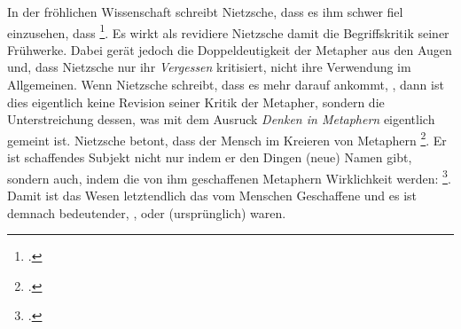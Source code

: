 \documentclass[12pt, a4paper, openany]{report}
\begin{document}
In der fröhlichen Wissenschaft schreibt Nietzsche, dass es ihm schwer fiel einzusehen, dass \footcite[][§ 58. S. 422.]{nietzsche_morgenrote_1999}.
Es wirkt als revidiere Nietzsche damit die Begriffskritik seiner Frühwerke.
Dabei gerät jedoch die Doppeldeutigkeit der Metapher aus den Augen und, dass Nietzsche nur ihr \emph{Vergessen} kritisiert, nicht ihre Verwendung im Allgemeinen. 
Wenn Nietzsche schreibt, dass es mehr darauf ankommt, , dann ist dies eigentlich keine Revision seiner Kritik der Metapher, sondern die Unterstreichung dessen, was mit dem Ausruck \emph{Denken in Metaphern} eigentlich gemeint ist.
Nietzsche betont, dass der Mensch im Kreieren von Metaphern \footcite[][883]{nietzsche_geburt_1999}.
Er ist schaffendes Subjekt nicht nur indem er den Dingen (neue) Namen gibt, sondern auch, indem die von ihm geschaffenen Metaphern Wirklichkeit werden: 
\footcite[][§ 58, S. 422]{nietzsche_morgenrote_1999}.
Damit ist das Wesen letztendlich das vom Menschen Geschaffene und es ist demnach bedeutender, , oder (ursprünglich) waren.
\end{document}
